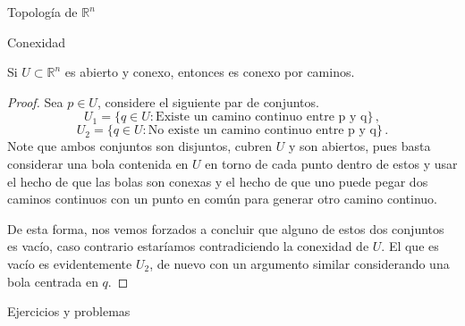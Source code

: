 \begin{chapter}{Topología de $\mathbb{R}^n$}
\begin{section}{Conexidad}
\begin{them}
Si $U \subset \mathbb{R}^n$ es abierto y conexo, entonces es conexo por caminos.

\end{them}

\begin{proof}

Sea $p \in U$, considere el siguiente par de conjuntos. 
$$U_1 = \{ q \in U: \text{Existe un camino continuo entre p y q} \}\,,$$
$$U_2 =  \{ q \in U: \text{No existe un camino continuo entre p y q} \}\,.$$
Note que ambos conjuntos son disjuntos, cubren $U$ y son abiertos, pues basta considerar una bola contenida en $U$ en torno de cada punto dentro de estos y usar el hecho de que las bolas son conexas y el hecho de que uno puede pegar dos caminos continuos con un punto en común para generar otro camino continuo.

De esta forma, nos vemos forzados a concluir que alguno de estos dos conjuntos es vacío, caso contrario estaríamos contradiciendo la conexidad de $U$. El que es vacío es evidentemente $U_2$, de nuevo con un argumento similar considerando una bola centrada en $q$.
\end{proof}

\end{section}

\begin{section}{Ejercicios y problemas}


\end{section}
\end{chapter}
